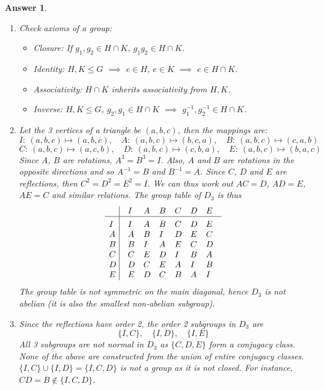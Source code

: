 \documentclass[a4paper]{article}
\newtheorem{ans}{Answer}[section]
\theoremstyle{new}
\begin{document}
\begin{ans}\leavevmode
\begin{enumerate}[label=(\roman*)]
\item Check axioms of a group:
\begin{itemize}
    \item Closure: If $g_1,g_2\in H\cap K$, $g_1g_2\in H\cap K$.
    \item Identity: $H,K\leq G$ $\implies$ $e\in H$, $e\in K$ $\implies$ $e\in H\cap K$.
    \item Associativity: $H\cap K$ inherits associativity from $H,K$.
    \item Inverse: $H,K\leq G$, $g_2,g_1\in H\cap K$ $\implies$ $g_1^{-1},g_2^{-1}\in H\cap K$.
\end{itemize}
\item Let the 3 vertices of a triangle be $(a,b,c)$, then the mappings are:
$$I:~(a,b,c)\mapsto(a,b,c),\quad A:~(a,b,c)\mapsto(b,c,a),\quad B:~(a,b,c)\mapsto(c,a,b)$$
$$C:~(a,b,c)\mapsto(a,c,b),\quad D:~(a,b,c)\mapsto(c,b,a),\quad E:~(a,b,c)\mapsto(b,a,c)$$
Since $A$, $B$ are rotations, $A^3=B^3=I$. Also, $A$ and $B$ are rotations in the opposite directions and so $A^{-1}=B$ and $B^{-1}=A$. Since $C$, $D$ and $E$ are reflections, then $C^2=D^2=E^2=I$. We can thus work out $AC=D$, $AD=E$, $AE=C$ and similar relations. The group table of $D_3$ is thus
$$\vbox{\tabskip0.5em\offinterlineskip
    \halign{\strut$#$\hfil\ \tabskip1em\vrule&&$#$\hfil\cr
      & I   & A  & B & C & D &E     \cr
    \noalign{\hrule}\vrule height 12pt width 0pt
    I   & I   & A  & B & C & D &E   \cr
    A   & A & B &I &D &E &C  \cr
    B & B & I & A & E &C &D \cr
    C & C &E & D& I & B &A     \cr
    D& D &C&E&A&I&B\cr
    E& E &D &C &B &A&I\cr
}}$$
The group table is not symmetric on the main diagonal, hence $D_3$ is not abelian (it is also the smallest non-abelian subgroup).
\item Since the reflections have order 2, the order 2 subgroups in $D_3$ are 
$$\{I,C\},\quad\{I,D\},\quad\{I,E\}$$
All 3 subgroups are not normal in $D_3$ as $\{C,D,E\}$ form a conjugacy class. None of the above are constructed from the union of entire conjugacy classes. $\{I,C\}\cup\{I,D\}=\{I,C,D\}$ is not a group as it is not closed. For instance, $CD=B\notin\{I,C,D\}$.
\end{enumerate}
\end{ans}
\newpage
\end{document}

